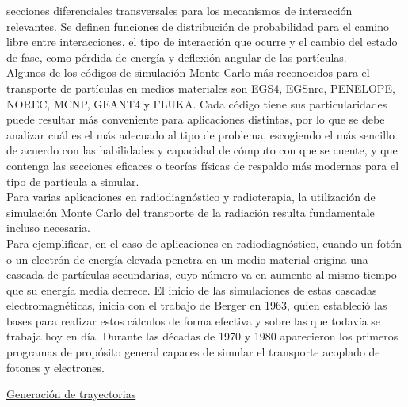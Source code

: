 secciones diferenciales transversales para los mecanismos de interacci\'on relevantes.
%
Se definen funciones de distribuci\'on de probabilidad para el camino libre entre interacciones, el tipo de interacci\'on que ocurre y
el cambio del estado de fase, como p\'erdida de energ\'ia y deflexi\'on angular de las part\'iculas. \\
%
%
Algunos de los c\'odigos de simulaci\'on Monte Carlo m\'as reconocidos para el transporte de part\'iculas en medios
materiales son EGS4, EGSnrc, PENELOPE, NOREC, MCNP, GEANT4 y FLUKA.
%
Cada c\'odigo tiene sus particularidades puede resultar m\'as conveniente para aplicaciones distintas, por lo que se debe analizar
cu\'al es el m\'as adecuado al tipo de problema, escogiendo el m\'as sencillo de acuerdo con las habilidades y capacidad de c\'omputo
con que se cuente, y que contenga las secciones eficaces o teor\'ias f\'isicas de respaldo m\'as modernas para el tipo de part\'icula a
simular. \\
%
%
Para varias aplicaciones en radiodiagn\'ostico y radioterapia, la utilizaci\'on de simulaci\'on Monte Carlo del transporte de la
radiaci\'on resulta fundamentale incluso necesaria. \\
%
%
Para ejemplificar, en el caso de aplicaciones en radiodiagn\'ostico, cuando un fot\'on o un electr\'on de energ\'ia elevada penetra en un
medio material origina una cascada de part\'iculas secundarias, cuyo n\'umero va en aumento al mismo tiempo que su energ\'ia media
decrece.
%
El inicio de las simulaciones de estas cascadas electromagn\'eticas, inicia con el trabajo de Berger en 1963, quien estableci\'o las
bases para realizar estos c\'alculos de forma efectiva y sobre las que todav\'ia se trabaja hoy en d\'ia.
%
Durante las d\'ecadas de 1970 y 1980 aparecieron los primeros programas de prop\'osito general capaces de simular el transporte acoplado de
fotones y electrones.
%

\begin{center}
\underline{Generaci\'on de trayectorias}
\end{center}

